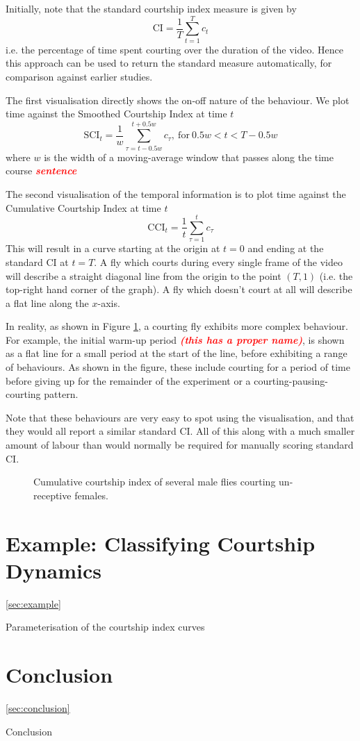 \documentclass{article}
\newcommand{\todo}[1]{\textsf{\emph{\textbf{\textcolor{red}{#1}}}}}
\begin{document}
Initially, note that the standard courtship index measure is given by
\begin{equation}
	\mathrm{CI} = \frac{1}{T}\sum_{t=1}^Tc_t
\end{equation}
i.e. the percentage of time spent courting over the duration of the video. Hence this approach can be used to return the standard measure automatically, for comparison against earlier studies. 

The first visualisation directly shows the on-off nature of the behaviour. We plot time against the Smoothed Courtship Index at time $t$
\begin{equation}
	\mathrm{SCI}_t = \frac{1}{w}\sum_{\tau=t-0.5w}^{t+0.5w}c_\tau, ~ \mathrm{for} ~ 0.5w<t<T-0.5w
\end{equation}
where $w$ is the width of a moving-average window that passes along the time course \todo{sentence}

The second visualisation of the temporal information is to plot time against the Cumulative Courtship Index at time $t$
\begin{equation}
	\mathrm{CCI}_t = \frac{1}{t}\sum_{\tau=1}^t c_\tau
\end{equation}
This will result in a curve starting at the origin at $t=0$ and ending at the standard CI at $t=T$. A fly which courts during every single frame of the video will describe a straight diagonal line from the origin to the point $(T,1)$ (i.e. the top-right hand corner of the graph). A fly which doesn't court at all will describe a flat line along the $x$-axis. 

In reality, as shown in Figure \ref{fig:CCI}, a courting fly exhibits more complex behaviour. For example, the initial warm-up period \todo{(this has a proper name)}, is shown as a flat line for a small period at the start of the line, before exhibiting a range of behaviours. As shown in the figure, these include courting for a period of time before giving up for the remainder of the experiment or a courting-pausing-courting pattern. 

Note that these behaviours are very easy to spot using the visualisation, and that they would all report a similar standard CI. All of this along with a much smaller amount of labour than would normally be required for manually scoring standard CI.

\begin{figure}
	\caption{Cumulative courtship index of several male flies courting un-receptive females.}
	\label{fig:CCI}
\end{figure}

 

\section{Example: Classifying Courtship Dynamics}
\ref{sec:example}

Parameterisation of the courtship index curves


\section{Conclusion}
\ref{sec:conclusion}

Conclusion
\end{document}
